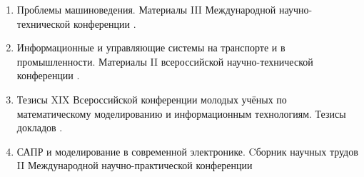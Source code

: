 \begin{enumerate}
\item Проблемы машиноведения. Материалы III Международной научно-технической конференции \cite{cache_oriented2019}.

\item Информационные и управляющие системы на транспорте и в промышленности. Материалы II всероссийской научно-технической конференции \cite{accuracy_study2018}.

\item Тезисы XIX Всероссийской конференции молодых учёных по математическому моделированию и информационным технологиям. Тезисы докладов \cite{efficiency_mark2018}.

\item  САПР и моделирование в современной электронике. Cборник научных трудов II Международной научно-практической конференции \cite{information-measuring2018}

\end{enumerate}

